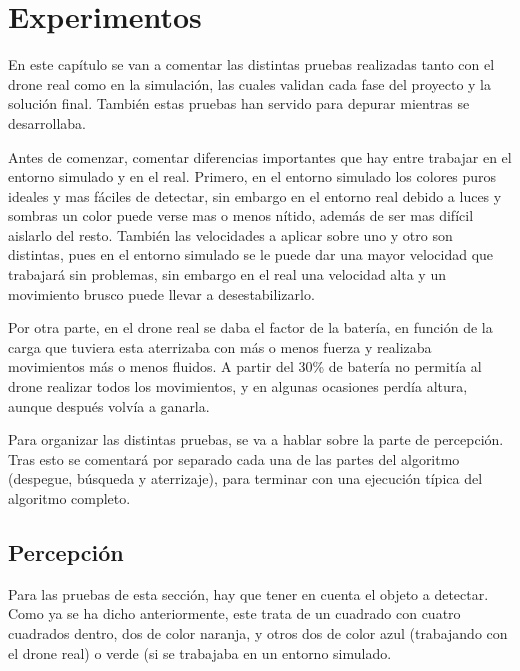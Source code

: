 \chapter{Experimentos}\label{cap.experimentos}
\hspace{1cm} En este cap\'itulo se van a comentar las distintas pruebas realizadas tanto con el drone real como en la simulaci\'on, las cuales validan cada fase del proyecto y la soluci\'on final. Tambi\'en estas pruebas han servido para depurar mientras se desarrollaba. 

\hspace{1cm} Antes de comenzar, comentar diferencias importantes que hay entre trabajar en el entorno simulado y en el real. Primero, en el entorno simulado los colores puros ideales y mas f\'aciles de detectar, sin embargo en el entorno real debido a luces y sombras un color puede verse mas o menos n\'itido, adem\'as de ser mas dif\'icil aislarlo del resto. Tambi\'en las velocidades a aplicar sobre uno y otro son distintas, pues en el entorno simulado se le puede dar una mayor velocidad que trabajar\'a sin problemas, sin embargo en el real una velocidad alta y un movimiento brusco puede llevar a desestabilizarlo. 

\hspace{1cm} Por otra parte, en el drone real se daba el factor de la bater\'ia, en funci\'on de la carga que tuviera esta aterrizaba con m\'as o menos fuerza y realizaba movimientos m\'as o menos fluidos. A partir del 30\% de bater\'ia no permit\'ia al drone realizar todos los movimientos, y en algunas ocasiones perd\'ia altura, aunque despu\'es volv\'ia a ganarla. 

\hspace{1cm} Para organizar las distintas pruebas, se va a hablar sobre la parte de percepci\'on. Tras esto se comentar\'a por separado cada una de las partes del algoritmo (despegue, b\'usqueda y aterrizaje), para terminar con una ejecuci\'on t\'ipica del algoritmo completo.

\section{Percepci\'on }\label{sec:percepcion}

\hspace{1cm} Para las pruebas de esta secci\'on, hay que tener en cuenta el objeto a detectar. Como ya se ha dicho anteriormente, este trata de un cuadrado con cuatro cuadrados dentro, dos de color naranja, y otros dos de color azul (trabajando con el drone real) o verde (si se trabajaba en un entorno simulado. 

